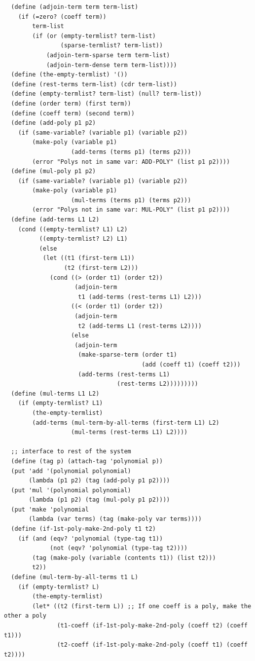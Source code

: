 \documentclass[final,fleqn,titlepage,twoside]{article}
\begin{document}
\begin{verbatim}
  (define (adjoin-term term term-list)
    (if (=zero? (coeff term))
        term-list
        (if (or (empty-termlist? term-list)
                (sparse-termlist? term-list))
            (adjoin-term-sparse term term-list)
            (adjoin-term-dense term term-list))))
  (define (the-empty-termlist) '())
  (define (rest-terms term-list) (cdr term-list))
  (define (empty-termlist? term-list) (null? term-list))
  (define (order term) (first term))
  (define (coeff term) (second term))
  (define (add-poly p1 p2)
    (if (same-variable? (variable p1) (variable p2))
        (make-poly (variable p1)
                   (add-terms (terms p1) (terms p2)))
        (error "Polys not in same var: ADD-POLY" (list p1 p2))))
  (define (mul-poly p1 p2)
    (if (same-variable? (variable p1) (variable p2))
        (make-poly (variable p1)
                   (mul-terms (terms p1) (terms p2)))
        (error "Polys not in same var: MUL-POLY" (list p1 p2))))
  (define (add-terms L1 L2)
    (cond ((empty-termlist? L1) L2)
          ((empty-termlist? L2) L1)
          (else
           (let ((t1 (first-term L1))
                 (t2 (first-term L2)))
             (cond ((> (order t1) (order t2))
                    (adjoin-term
                     t1 (add-terms (rest-terms L1) L2)))
                   ((< (order t1) (order t2))
                    (adjoin-term
                     t2 (add-terms L1 (rest-terms L2))))
                   (else
                    (adjoin-term
                     (make-sparse-term (order t1)
                                       (add (coeff t1) (coeff t2)))
                     (add-terms (rest-terms L1)
                                (rest-terms L2)))))))))
  (define (mul-terms L1 L2)
    (if (empty-termlist? L1)
        (the-empty-termlist)
        (add-terms (mul-term-by-all-terms (first-term L1) L2)
                   (mul-terms (rest-terms L1) L2))))
  
  ;; interface to rest of the system
  (define (tag p) (attach-tag 'polynomial p))
  (put 'add '(polynomial polynomial)
       (lambda (p1 p2) (tag (add-poly p1 p2))))
  (put 'mul '(polynomial polynomial)
       (lambda (p1 p2) (tag (mul-poly p1 p2))))
  (put 'make 'polynomial
       (lambda (var terms) (tag (make-poly var terms))))
  (define (if-1st-poly-make-2nd-poly t1 t2)
    (if (and (eqv? 'polynomial (type-tag t1))
             (not (eqv? 'polynomial (type-tag t2))))
        (tag (make-poly (variable (contents t1)) (list t2)))
        t2))
  (define (mul-term-by-all-terms t1 L)
    (if (empty-termlist? L)
        (the-empty-termlist)
        (let* ((t2 (first-term L)) ;; If one coeff is a poly, make the other a poly
               (t1-coeff (if-1st-poly-make-2nd-poly (coeff t2) (coeff t1)))
               (t2-coeff (if-1st-poly-make-2nd-poly (coeff t1) (coeff t2))))
          

\end{verbatim}
\end{document}
